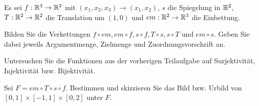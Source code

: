 \begin{Problem}
	Es sei $f: \mathbb{R}^3\to \mathbb{R}^2$ mit $(x_1, x_2, x_3) \to (x_1, x_2)$, $s$ die Spiegelung in $\mathbb{R}^2$, $T : \mathbb{R}^2 \to \mathbb{R}^2$ die Translation um $(1, 0)$ und $em : \mathbb{R}^2 \to \mathbb{R}^3$ die Einbettung.
	\begin{parts}
		\item 	Bilden Sie die Verkettungen $f \circ em, em \circ f , s \circ f , T \circ s, s \circ T$ und $em \circ s$. Geben Sie dabei jeweils Argumentmenge, Zielmenge und Zuordnungsvorschrift an.
		\item  Untersuchen Sie die Funktionen aus der vorherigen Teilaufgabe auf Surjektivit\"{a}t, Injektivit\"{a}t bzw. Bijektivit\"{a}t.
		\item  Sei $F = em\circ T \circ s\circ f$. Bestimmen und skizzieren Sie das Bild bzw. Urbild von $[0,1]\times [-1,1]\times [0,2]$ unter  $F$.
	\end{parts}
\end{Problem}

